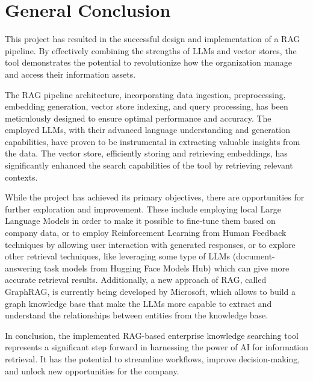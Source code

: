 \chapter*{General Conclusion}
\hspace{1cm}This project has resulted in the successful design and implementation of a RAG pipeline. By effectively combining the strengths of LLMs and vector stores, the tool demonstrates the potential to revolutionize how the organization manage and access their information assets.\bigskip

The RAG pipeline architecture, incorporating data ingestion, preprocessing, embedding generation, vector store indexing, and query processing, has been meticulously designed to ensure optimal performance and accuracy. The employed LLMs, with their advanced language understanding and generation capabilities, have proven to be instrumental in extracting valuable insights from the data. The vector store, efficiently storing and retrieving embeddings, has significantly enhanced the search capabilities of the tool by retrieving relevant contexts.\bigskip

While the project has achieved its primary objectives, there are opportunities for further exploration and improvement. These include employing local Large Language Models in order to make it possible to fine-tune them based on company data, or to employ Reinforcement Learning from Human Feedback techniques by allowing user interaction with generated responses, or to explore other retrieval techniques, like leveraging some type of LLMs (document-answering task models from Hugging Face Models Hub) which can give more accurate retrieval results. Additionally, a new approach of RAG, called GraphRAG, is currently being developed by Microsoft, which allows to build a graph knowledge base that make the LLMs more capable to extract and understand the relationships between entities from the knowledge base.\bigskip

In conclusion, the implemented RAG-based enterprise knowledge searching tool represents a significant step forward in harnessing the power of AI for information retrieval. It has the potential to streamline workflows, improve decision-making, and unlock new opportunities for the company.